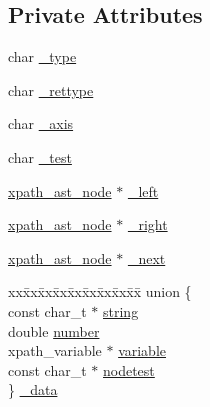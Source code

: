 \subsection*{Private Attributes}
\begin{DoxyCompactItemize}
\item 
char \hyperlink{classxpath__ast__node_ad285f423090a0aaee3c4126da65066d1}{\_\-type}
\item 
char \hyperlink{classxpath__ast__node_ab84a640f3a0f00d4d611d8cdd1f5c029}{\_\-rettype}
\item 
char \hyperlink{classxpath__ast__node_a97b21db6df156c37ef7f2e6f69478b77}{\_\-axis}
\item 
char \hyperlink{classxpath__ast__node_a421f6ed5f666ced9d6fe3692e84d7b89}{\_\-test}
\item 
\hyperlink{classxpath__ast__node}{xpath\_\-ast\_\-node} $\ast$ \hyperlink{classxpath__ast__node_ad229146ced94be21eb5e4921b43a7ebb}{\_\-left}
\item 
\hyperlink{classxpath__ast__node}{xpath\_\-ast\_\-node} $\ast$ \hyperlink{classxpath__ast__node_ab3935ea7e83f4421b20840cd84f0b37d}{\_\-right}
\item 
\hyperlink{classxpath__ast__node}{xpath\_\-ast\_\-node} $\ast$ \hyperlink{classxpath__ast__node_a10059a66ecff3384e175e00d9fa2afcd}{\_\-next}
\item 
\begin{tabbing}
xx\=xx\=xx\=xx\=xx\=xx\=xx\=xx\=xx\=\kill
union \{\\
\>const char\_t $\ast$ \hyperlink{classxpath__ast__node_a187822d65799b3bbccd8d0522bd14e59}{string}\\
\>double \hyperlink{classxpath__ast__node_a73870c7a83538e525398855b26154484}{number}\\
\>xpath\_variable $\ast$ \hyperlink{classxpath__ast__node_a0fd3b0d8f930836105eeff6e2efa5ad3}{variable}\\
\>const char\_t $\ast$ \hyperlink{classxpath__ast__node_a50f44079b7f3e399e23488f520a34f17}{nodetest}\\
\} \hyperlink{classxpath__ast__node_a4d08bfca00b137fc5b94314edeed2501}{\_data}\\

\end{tabbing}\end{DoxyCompactItemize}


